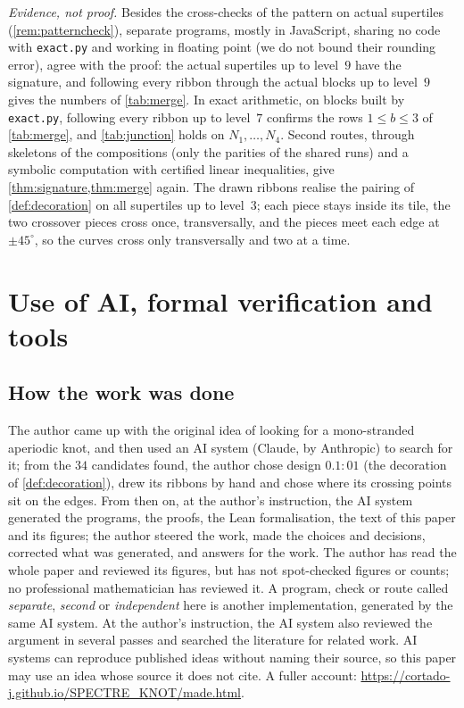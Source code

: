 \documentclass[11pt]{amsart}
\theoremstyle{definition}
\theoremstyle{remark}
\newcommand{\code}[1]{\texttt{#1}}
\begin{document}
\emph{Evidence, not proof.} Besides the cross-checks of the pattern on actual supertiles (\cref{rem:patterncheck}),
separate programs, mostly in JavaScript, sharing no code with \code{exact.py} and working in floating point (we do not
bound their rounding error), agree with the proof: the actual supertiles up to level~$9$ have the signature, and
following every ribbon through the actual blocks up to level~$9$ gives the numbers of \cref{tab:merge}. In exact
arithmetic, on blocks built by \code{exact.py}, following every ribbon up to level~$7$ confirms the rows $1\le b\le3$
of \cref{tab:merge}, and \cref{tab:junction} holds on $N_1,\dots,N_4$. Second routes, through skeletons of the
compositions (only the parities of the shared runs) and a symbolic computation with certified linear inequalities, give
\cref{thm:signature,thm:merge} again. The drawn ribbons realise the pairing of \cref{def:decoration} on all supertiles
up to level~$3$; each piece stays inside its tile, the two crossover pieces cross once, transversally, and the pieces
meet each edge at $\pm45^\circ$, so the curves cross only transversally and two at a time.

\section{Use of AI, formal verification and tools}\label{app:ai}

\subsection*{How the work was done}
The author came up with the original idea of looking for a mono-stranded aperiodic knot, and then used an AI system
(Claude, by Anthropic) to search for it; from the $34$ candidates found, the author chose design $0.1{:}01$ (the
decoration of \cref{def:decoration}), drew its ribbons by hand and chose where its crossing points sit on the edges.
From then on, at the author's instruction, the AI system generated the programs, the proofs, the Lean formalisation,
the text of this paper and its figures; the author steered the work, made the choices and decisions, corrected what was
generated, and answers for the work. The author has read the whole paper and reviewed its figures, but has not
spot-checked figures or counts; no professional mathematician has reviewed it. A program, check or route called \emph{separate}, \emph{second} or
\emph{independent} here is another implementation, generated by the same AI system. At the author's instruction, the
AI system also reviewed the argument in several passes and searched the literature for related work. AI systems can
reproduce published ideas without naming their source, so this paper may use an idea whose source it does not cite. A
fuller account: \url{https://cortado-j.github.io/SPECTRE_KNOT/made.html}.
\end{document}
